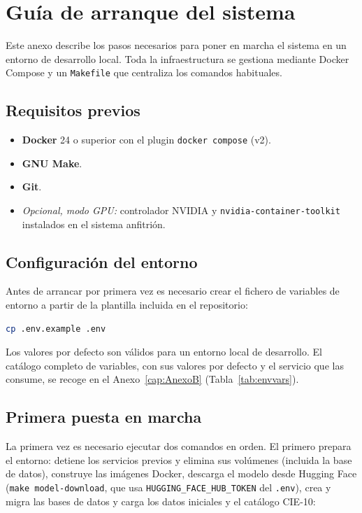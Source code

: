 \chapter{Guía de arranque del sistema}
\label{cap:AnexoK}

Este anexo describe los pasos necesarios para poner en marcha el sistema en un entorno de desarrollo local. Toda la infraestructura se gestiona mediante Docker Compose y un \texttt{Makefile} que centraliza los comandos habituales.

\section{Requisitos previos}

\begin{itemize}
 \item \textbf{Docker} 24 o superior con el plugin \texttt{docker compose} (v2).
 \item \textbf{GNU Make}.
 \item \textbf{Git}.
 \item \textit{Opcional, modo GPU:} controlador NVIDIA y \texttt{nvidia-container-toolkit} instalados en el sistema anfitrión.
\end{itemize}

\section{Configuración del entorno}

Antes de arrancar por primera vez es necesario crear el fichero de variables de entorno a partir de la plantilla incluida en el repositorio:

\begin{lstlisting}[language=bash]
cp .env.example .env
\end{lstlisting}

Los valores por defecto son válidos para un entorno local de desarrollo. El catálogo completo de variables, con sus valores por defecto y el servicio que las consume, se recoge en el Anexo~\ref{cap:AnexoB} (Tabla~\ref{tab:envvars}).

\section{Primera puesta en marcha}

La primera vez es necesario ejecutar dos comandos en orden. El primero prepara el entorno: detiene los servicios previos y elimina sus volúmenes (incluida la base de datos), construye las imágenes Docker, descarga el modelo desde Hugging Face (\texttt{make model-download}, que usa \texttt{HUGGING\_FACE\_HUB\_TOKEN} del \texttt{.env}), crea y migra las bases de datos y carga los datos iniciales y el catálogo CIE-10:

